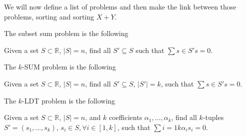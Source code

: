We will now define a list of problems and then make the link between those
problems, sorting and sorting $X + Y$.

The subset sum problem is the following

\begin{problem}
Given a set $S \subset \mathbb{R}$, $\left\vert{S}\right\vert = n$, find all
$S' \subseteq S$ such that $\sum{s \in S'} s = 0$.
\end{problem}


The $k$-SUM problem is the following

\begin{problem}
Given a set $S \subset \mathbb{R}$, $\left\vert{S}\right\vert = n$, find all
$S' \subseteq S$, $\left\vert{S'}\right\vert = k$, such that $\sum{s \in S'} s = 0$.
\end{problem}

The $k$-LDT problem is the following

\begin{problem}
Given a set $S \subset \mathbb{R}$, $\left\vert{S}\right\vert = n$, and $k$
coefficients $\alpha_1, \dots, \alpha_k$, find all $k$-tuples $S' = (s_1, \dots, s_k)$, $s_i \in S, \forall i \in [1,k]$, such that $\sum{i=1}{k} \alpha_i s_i = 0$.
\end{problem}

